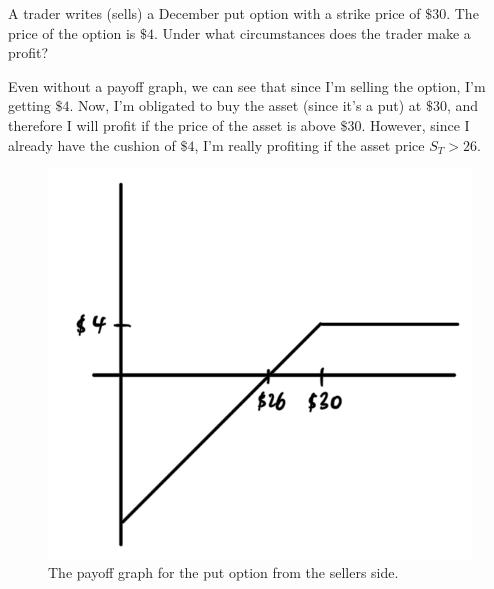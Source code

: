 \documentclass{article}
\begin{document}
  \begin{exercise}[Hull 1.16]
    A trader writes (sells) a December put option with a strike price of $\$30$. The price of the option is $\$4$. Under what circumstances does the trader make a profit? 
  \end{exercise}
  \begin{solution}
    Even without a payoff graph, we can see that since I'm selling the option, I'm getting $\$4$. Now, I'm obligated to buy the asset (since it's a put) at $\$30$, and therefore I will profit if the price of the asset is above $\$30$. However, since I already have the cushion of $\$4$, I'm really profiting if the asset price $S_T > 26$. 
    \begin{figure}[H]
      \centering 
      \includegraphics[scale=0.2]{img/ex1-16.png}
      \caption{The payoff graph for the put option from the sellers side.} 
      \label{fig:ex1-16}
    \end{figure}
  \end{solution}
\end{document}
